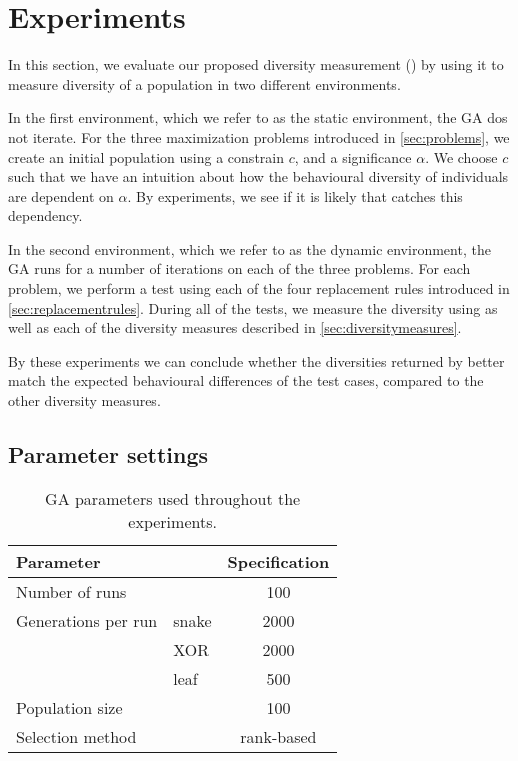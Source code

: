 \section{Experiments}\label{sec:experiments}
In this section, we evaluate our proposed diversity measurement (\dia) by using it to measure diversity of a population in two different environments.

In the first environment, which we refer to as the static environment, the GA dos not iterate.
For the three maximization problems introduced in \cref{sec:problems}, we create an initial population using a constrain $c$, and a significance $\alpha$. We choose $c$ such that we have an intuition about how the behavioural diversity of individuals are dependent on $\alpha$. By experiments, we see if it is likely that \dia{} catches this dependency.

In the second environment, which we refer to as the dynamic environment, the GA runs for a number of iterations on each of the three problems. 
For each problem, we perform a test using each of the four replacement rules introduced in \cref{sec:replacementrules}.
During all of the tests, we measure the diversity using \dia{} as well as each of the diversity measures described in \cref{sec:diversitymeasures}.

By these experiments we can conclude whether the diversities returned by \dia{} better match the expected behavioural differences of the test cases, compared to the other diversity measures.

\subsection{Parameter settings}

\begin{table}
  \centering
  \begin{tabular}{l l S}
    \toprule
    Parameter & & {Specification} \\
    \midrule
    Number of runs & & 100 \\
    Generations per run & snake & 2000 \\
    & XOR & 2000 \\
    & leaf & 500 \\
    Population size & & 100 \\
    Selection method & & {rank-based} \\
    \bottomrule
  \end{tabular}
  \caption{GA parameters used throughout the experiments.}
  \label{tab:gaparam}
\end{table}

